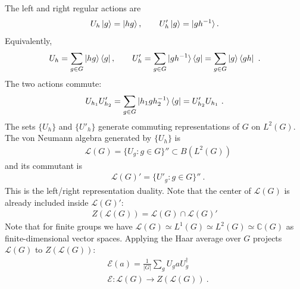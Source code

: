 \documentclass[11pt]{article}
\newcommand{\nn}{\nonumber}
\begin{document}
The left and right regular actions are
\begin{eqnarray}
    U_h\ket{g}=\ket{h g}, \qquad U'_h\ket{g}=\ket{g h^{-1}}.
\end{eqnarray}
Equivalently,
\begin{eqnarray}
    U_h=\sum_{g\in G}\ket{h g}\bra{g},\qquad
    U'_h=\sum_{g\in G}\ket{g h^{-1}}\bra{g}
        =\sum_{g\in G}\ket{g}\bra{g h}\ .
\end{eqnarray}
The two actions commute:
\begin{eqnarray}
    U_{h_1}U'_{h_2}=\sum_{g\in G}\ket{h_1 g h_2^{-1}}\bra{g}=U'_{h_2}U_{h_1}\ .
\end{eqnarray}
The sets $\{U_h\}$ and $\{U'_h\}$ generate commuting representations of
$G$ on $L^2(G)$.
The von Neumann algebra generated by $\{U_h\}$ is 
\begin{align}
    &\mathcal{L}(G)=\{U_g:g\in G\}''\subset B(L^2(G))
\end{align}
and its commutant is 
\begin{align}
    &\mathcal{L}(G)'=\{U'_g:g\in G\}''\ .
\end{align}
This is the left/right representation duality. Note that the center of $\mathcal{L}(G)$ is already included inside $\mathcal{L}(G)'$:
\begin{align}
    Z(\mathcal{L}(G))=\mathcal{L}(G)\cap \mathcal{L}(G)'
\end{align}
Note that for finite groups we have $\mathcal{L}(G)\simeq L^1(G)\simeq L^2(G)\simeq \mathbb{C}(G)$ as finite-dimensional vector spaces.
Applying the Haar average over $G$ projects $\mathcal L(G)$ to $Z(\mathcal L(G))$:
\begin{align}
    &\mathcal{E}(a)=\frac{1}{|G|}\sum_g U_g a U_g^\dagger\nn\\
    &\mathcal{E}:\mathcal L(G)\to Z(\mathcal L(G))\ .
\end{align}
\end{document}
